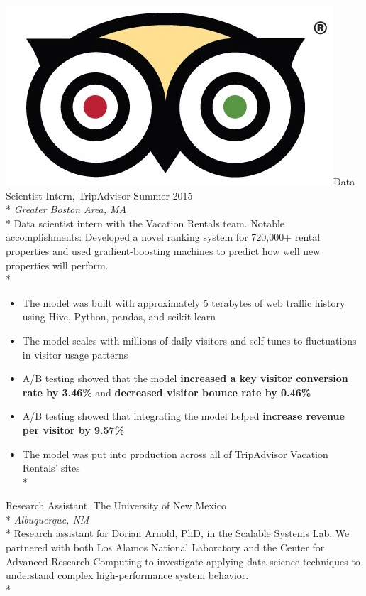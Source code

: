 \documentclass[print]{friggeri-cv} %
\newcommand{\tripicon}{\includegraphics[scale=0.05]{trip_logo.jpg}}%
\begin{document}
\begin{description} \itemsep1pt \parskip0pt 
  \item \tripicon {\largeheaderfont Data Scientist Intern, TripAdvisor } \hfill
    {\smallheaderfont Summer 2015}\\*
    {\footnotesize \emph{Greater Boston Area, MA}} \\*
    Data scientist intern with the Vacation Rentals team.
    {\smallheaderfont Notable accomplishments}:
    Developed a novel ranking system for
    720,000+ rental properties and used gradient-boosting machines to predict
    how well new properties will perform. \\*
    \begin{itemize} \itemsep1pt \parskip1pt 
      \item The model was built with approximately 5 terabytes of web traffic
            history using Hive, Python, pandas, and scikit-learn
      \item The model scales with millions of daily visitors and self-tunes to
            fluctuations in visitor usage patterns
      \item A/B testing showed that the model \textbf{increased a key visitor conversion
            rate by 3.46\%} and \textbf{decreased visitor bounce rate by 0.46\%}
      \item A/B testing showed that integrating the model helped
            \textbf{increase revenue per visitor by 9.57\%}
      \item The model was put into production across all of TripAdvisor Vacation Rentals' sites\\*
    \end{itemize}

  \item {\largeheaderfont Research Assistant, The University of New Mexico} \hfill
    {}\\*
    {\footnotesize \emph{Albuquerque, NM }} \\*
    Research assistant for Dorian Arnold, PhD, in the Scalable Systems Lab. We
    partnered with both Los Alamos National Laboratory and the Center for
    Advanced Research Computing to investigate applying data science techniques
    to understand complex high-performance system behavior. \\*


\end{description}
\end{document}
